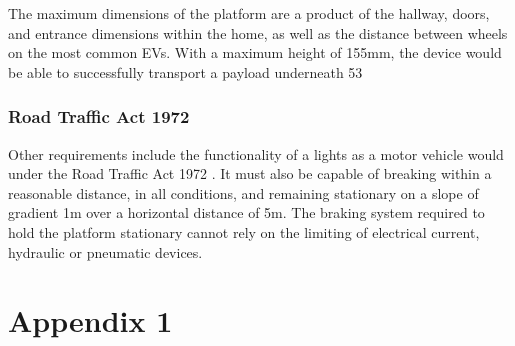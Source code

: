 \documentclass [12pt]{article}
\begin{document}
The maximum dimensions of the platform are a product of the hallway, doors, and entrance dimensions within the home, as well as the distance between wheels on the most common EVs. With a maximum height of 155mm, the device would be able to successfully transport a payload underneath 53%

\subsubsection{Road Traffic Act 1972}
Other requirements include the functionality of a lights as a motor vehicle would under the Road Traffic Act 1972 \cite{Road_Traffic}. It must also be capable of breaking within a reasonable distance, in all conditions, and remaining stationary on a slope of gradient 1m over a horizontal distance of 5m. The braking system required to hold the platform stationary cannot rely on the limiting of electrical current, hydraulic or pneumatic devices. 

\newpage



\newpage
\appendix

\section{Appendix 1}\label{app:appendix_1}
\end{document}
